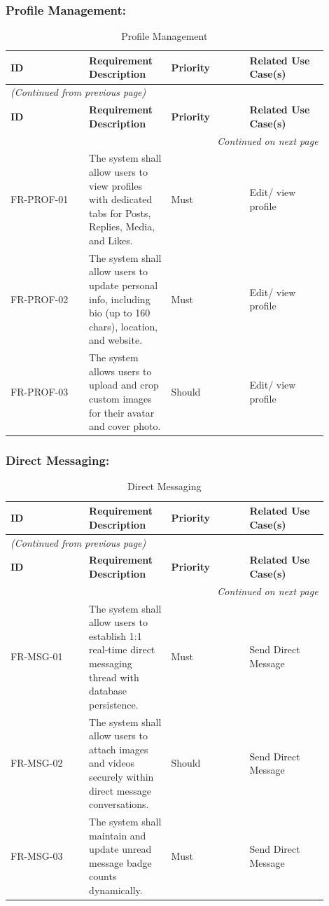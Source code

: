 \subsubsection{Profile Management:}

\begin{longtable}{|p{0.225\linewidth}|p{0.225\linewidth}|p{0.225\linewidth}|p{0.225\linewidth}|}
\caption{Profile Management} \label{tab:10} \\
\hline
\textbf{ID} & \textbf{Requirement Description} & \textbf{Priority} & \textbf{Related Use Case(s)} \\
\hline
\endfirsthead
\multicolumn{4}{l}{\textit{(Continued from previous page)}} \\
\hline
\textbf{ID} & \textbf{Requirement Description} & \textbf{Priority} & \textbf{Related Use Case(s)} \\
\hline
\endhead
\hline \multicolumn{4}{r}{\textit{Continued on next page}} \\
\endfoot
\hline
\endlastfoot
FR-PROF-01 & The system shall allow users to view profiles with dedicated tabs for Posts, Replies, Media, and Likes. & Must & Edit/ view profile \\
\hline
FR-PROF-02 & The system shall allow users to update personal info, including bio (up to 160 chars), location, and website. & Must & Edit/ view profile \\
\hline
FR-PROF-03 & The system allows users to upload and crop custom images for their avatar and cover photo. & Should & Edit/ view profile \\
\hline
\end{longtable}


\subsubsection{Direct Messaging:}

\begin{longtable}{|p{0.225\linewidth}|p{0.225\linewidth}|p{0.225\linewidth}|p{0.225\linewidth}|}
\caption{Direct Messaging} \label{tab:11} \\
\hline
\textbf{ID} & \textbf{Requirement Description} & \textbf{Priority} & \textbf{Related Use Case(s)} \\
\hline
\endfirsthead
\multicolumn{4}{l}{\textit{(Continued from previous page)}} \\
\hline
\textbf{ID} & \textbf{Requirement Description} & \textbf{Priority} & \textbf{Related Use Case(s)} \\
\hline
\endhead
\hline \multicolumn{4}{r}{\textit{Continued on next page}} \\
\endfoot
\hline
\endlastfoot
FR-MSG-01 & The system shall allow users to establish 1:1 real-time direct messaging thread with database persistence. & Must & Send Direct Message \\
\hline
FR-MSG-02 & The system shall allow users to attach images and videos securely within direct message conversations. & Should & Send Direct Message \\
\hline
FR-MSG-03 & The system shall maintain and update unread message badge counts dynamically. & Must & Send Direct Message \\
\hline
\end{longtable}


